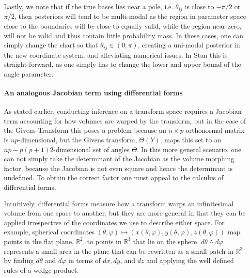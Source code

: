 \documentclass{article}
\begin{document}
Lastly, we note that if the true bases lies near a pole, i.e. $\theta_{ij}$ is close to $-\pi/2$ or $\pi/2$, then posteriors will tend to be multi-modal as the region in parameter space close to the boundaries will be close to equally valid, while the region near zero, will not be valid and thus contain little probability mass. In these cases, one can simply change the chart so that $\theta_{ij} \in (0, \pi)$, creating a uni-modal posterior in the new coordinate system, and alleviating numerical issues. In Stan this is straight-forward, as one simply has to change the lower and upper bound of the angle parameter.

\paragraph{An analogous Jacobian term using differential forms} As stated earlier, conducting inference on a transform space requires a Jacobian term accounting for how volumes are warped by the transform, but in the case of the Givens Transform this poses a problem because an $n \times p$ orthonormal matrix is $np$-dimensional, but the Givens transform, $\Theta(Y)$, maps this set to an $np - p(p+1)2$-dimensional set of angles $\Theta$. In this more general scenario, one can not simply take the determinant of the Jacobian as the volume morphing factor, because the Jacobian is not even square and hence the determinant is undefined. To obtain the correct factor one must appeal to the calculus of differential forms. 

Intuitively, differential forms measure how a transform warps an infinitesimal volume from one space to another, but they are more general in that they can be applied irrespective of the coordinates we use to describe either space. For example, spherical coordinates $(\theta, \varphi) \mapsto (x(\theta,\varphi), y(\theta,\varphi), z(\theta,\varphi))$ map points in the flat plane, $\mathbb{R}^2$, to points in $\mathbb{R}^3$ that lie on the sphere. $d\theta \wedge d\varphi$ represents a small area in the plane that can be rewritten as a small patch in $\mathbb{R}^3$ by finding $d\theta$ and $d\varphi$ in terms of $dx, dy$, and $dz$ and applying the well defined rules of a wedge product.
\end{document}
